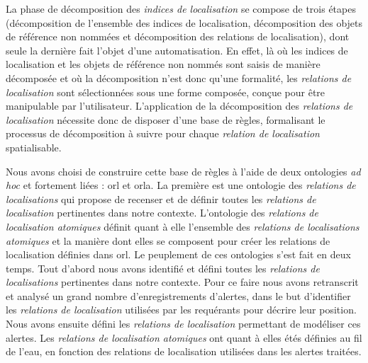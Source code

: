 La phase de décomposition des \emph{indices de localisation} se
compose de trois étapes (décomposition de l'ensemble des indices de
localisation, décomposition des objets de référence non nommées et
décomposition des relations de localisation), dont seule la dernière
fait l'objet d'une automatisation. En effet, là où les indices de
localisation et les objets de référence non nommés sont saisis de
manière décomposée et où la décomposition n'est donc qu'une formalité,
les \emph{relations de localisation} sont sélectionnées sous une forme
composée, conçue pour être manipulable par
l'utilisateur. L’application de la décomposition des \emph{relations
  de localisation} nécessite donc de disposer d'une base de règles,
formalisant le processus de décomposition à suivre pour chaque
\emph{relation de localisation} spatialisable.

Nous avons choisi de construire cette base de règles à l'aide de deux
ontologies \emph{ad hoc} et fortement liées : \ac{orl} et
\ac{orla}. La première est une ontologie des \emph{relations de
  localisations} qui propose de recenser et de définir toutes les
\emph{relations de localisation} pertinentes dans notre
contexte. L'ontologie des \emph{relations de localisation atomiques}
définit quant à elle l'ensemble des \emph{relations de localisations
  atomiques} et la manière dont elles se composent pour créer les
relations de localisation définies dans \ac{orl}. Le peuplement de ces
ontologies s'est fait en deux temps. Tout d'abord nous avons identifié
et défini toutes les \emph{relations de localisations} pertinentes
dans notre contexte. Pour ce faire nous avons retranscrit et analysé
un grand nombre d'enregistrements d'alertes, dans le but d'identifier
les \emph{relations de localisation} utilisées par les requérants pour
décrire leur position. Nous avons ensuite défini les \emph{relations
  de localisation} permettant de modéliser ces alertes. Les
\emph{relations de localisation atomiques} ont quant à elles étés
définies au fil de l'eau, en fonction des relations de localisation
utilisées dans les alertes traitées.

